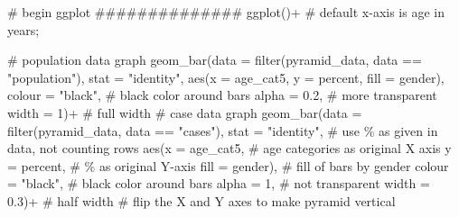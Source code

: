 \documentclass[
]{article}
\newenvironment{Shaded}{\begin{snugshade}}{\end{snugshade}}
\newcommand{\CommentTok}[1]{\textcolor[rgb]{0.50,0.62,0.50}{#1}}
\newcommand{\DataTypeTok}[1]{\textcolor[rgb]{0.87,0.87,0.75}{#1}}
\newcommand{\DecValTok}[1]{\textcolor[rgb]{0.86,0.86,0.80}{#1}}
\newcommand{\FloatTok}[1]{\textcolor[rgb]{0.75,0.75,0.82}{#1}}
\newcommand{\KeywordTok}[1]{\textcolor[rgb]{0.94,0.87,0.69}{#1}}
\newcommand{\NormalTok}[1]{\textcolor[rgb]{0.80,0.80,0.80}{#1}}
\newcommand{\OperatorTok}[1]{\textcolor[rgb]{0.94,0.94,0.82}{#1}}
\newcommand{\StringTok}[1]{\textcolor[rgb]{0.80,0.58,0.58}{#1}}
\begin{document}
\begin{Shaded}
\begin{Highlighting}[]

\CommentTok{\# begin ggplot}
\CommentTok{\#\#\#\#\#\#\#\#\#\#\#\#\#\#}
\KeywordTok{ggplot}\NormalTok{()}\OperatorTok{+}\StringTok{  }\CommentTok{\# default x{-}axis is age in years;}

\StringTok{  }\CommentTok{\# population data graph}
\StringTok{  }\KeywordTok{geom\_bar}\NormalTok{(}\DataTypeTok{data =} \KeywordTok{filter}\NormalTok{(pyramid\_data, data }\OperatorTok{==}\StringTok{ "population"}\NormalTok{),}
           \DataTypeTok{stat =} \StringTok{"identity"}\NormalTok{,}
           \KeywordTok{aes}\NormalTok{(}\DataTypeTok{x =}\NormalTok{ age\_cat5,}
               \DataTypeTok{y =}\NormalTok{ percent,}
               \DataTypeTok{fill =}\NormalTok{ gender),        }
           \DataTypeTok{colour =} \StringTok{"black"}\NormalTok{,                               }\CommentTok{\# black color around bars}
           \DataTypeTok{alpha =} \FloatTok{0.2}\NormalTok{,                                    }\CommentTok{\# more transparent}
           \DataTypeTok{width =} \DecValTok{1}\NormalTok{)}\OperatorTok{+}\StringTok{                                     }\CommentTok{\# full width}
\StringTok{  }
\StringTok{  }\CommentTok{\# case data graph}
\StringTok{  }\KeywordTok{geom\_bar}\NormalTok{(}\DataTypeTok{data =} \KeywordTok{filter}\NormalTok{(pyramid\_data, data }\OperatorTok{==}\StringTok{ "cases"}\NormalTok{), }
           \DataTypeTok{stat =} \StringTok{"identity"}\NormalTok{,                              }\CommentTok{\# use \% as given in data, not counting rows}
           \KeywordTok{aes}\NormalTok{(}\DataTypeTok{x =}\NormalTok{ age\_cat5,                               }\CommentTok{\# age categories as original X axis}
               \DataTypeTok{y =}\NormalTok{ percent,                                }\CommentTok{\# \% as original Y{-}axis}
               \DataTypeTok{fill =}\NormalTok{ gender),                             }\CommentTok{\# fill of bars by gender}
           \DataTypeTok{colour =} \StringTok{"black"}\NormalTok{,                               }\CommentTok{\# black color around bars}
           \DataTypeTok{alpha =} \DecValTok{1}\NormalTok{,                                      }\CommentTok{\# not transparent }
           \DataTypeTok{width =} \FloatTok{0.3}\NormalTok{)}\OperatorTok{+}\StringTok{                                   }\CommentTok{\# half width}
\StringTok{  }
\StringTok{  }\CommentTok{\# flip the X and Y axes to make pyramid vertical}

\end{Highlighting}
\end{Shaded}
\end{document}
